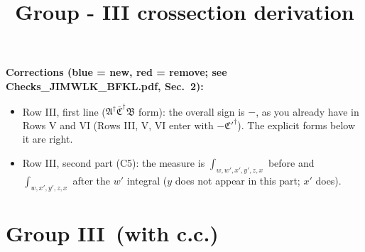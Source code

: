\documentclass[9pt]{article}
\title{Group - III crossection derivation}
\author{}
\date{}
\numberwithin{equation}{section}
\begin{document}
\maketitle
{\color{blue}\noindent\textbf{Corrections (blue = new, red = remove; see Checks\_JIMWLK\_BFKL.pdf, Sec.~2):}
\begin{itemize}
\item Row III, first line ($\mathfrak A^\dagger\bar{\mathfrak C}^\dagger\mathfrak B$ form): the overall sign is $-$, as you already have in Rows V and VI (Rows III, V, VI enter with $-\mathfrak C'^\dagger$). The explicit forms below it are right.
\item Row III, second part (C5): the measure is $\int_{w,w',x',y',z,x}$ before and $\int_{w,x',y',z,x}$ after the $w'$ integral ($y$ does not appear in this part; $x'$ does).
\end{itemize}}

\section{Group III\, (with c.c.)}
\end{document}
